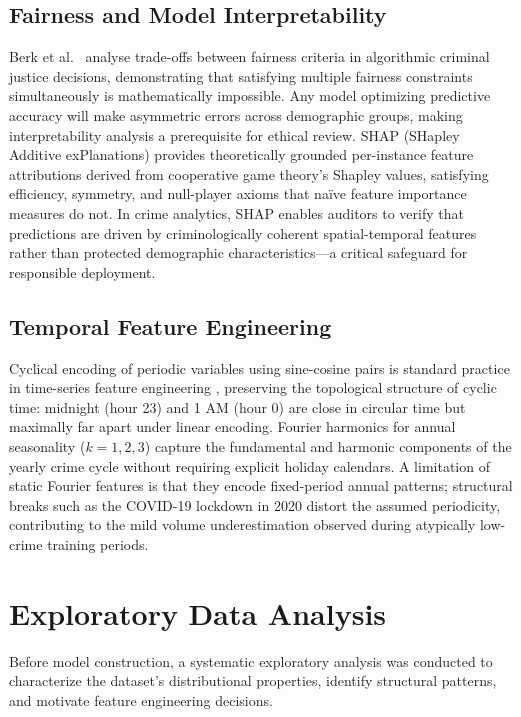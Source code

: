 \documentclass[conference]{IEEEtran}
\begin{document}
\subsection{Fairness and Model Interpretability}
Berk et al.\ \cite{berk2018} analyse trade-offs between fairness criteria in algorithmic criminal justice decisions, demonstrating that satisfying multiple fairness constraints simultaneously is mathematically impossible. Any model optimizing predictive accuracy will make asymmetric errors across demographic groups, making interpretability analysis a prerequisite for ethical review. SHAP (SHapley Additive exPlanations) \cite{lundberg2017} provides theoretically grounded per-instance feature attributions derived from cooperative game theory's Shapley values, satisfying efficiency, symmetry, and null-player axioms that naïve feature importance measures do not. In crime analytics, SHAP enables auditors to verify that predictions are driven by criminologically coherent spatial-temporal features rather than protected demographic characteristics—a critical safeguard for responsible deployment.

\subsection{Temporal Feature Engineering}
Cyclical encoding of periodic variables using sine-cosine pairs is standard practice in time-series feature engineering \cite{pedregosa2011}, preserving the topological structure of cyclic time: midnight (hour 23) and 1 AM (hour 0) are close in circular time but maximally far apart under linear encoding. Fourier harmonics for annual seasonality ($k=1,2,3$) capture the fundamental and harmonic components of the yearly crime cycle without requiring explicit holiday calendars. A limitation of static Fourier features is that they encode fixed-period annual patterns; structural breaks such as the COVID-19 lockdown in 2020 distort the assumed periodicity, contributing to the mild volume underestimation observed during atypically low-crime training periods.

\section{Exploratory Data Analysis}
\label{sec:eda}

Before model construction, a systematic exploratory analysis was conducted to characterize the dataset's distributional properties, identify structural patterns, and motivate feature engineering decisions.
\end{document}
